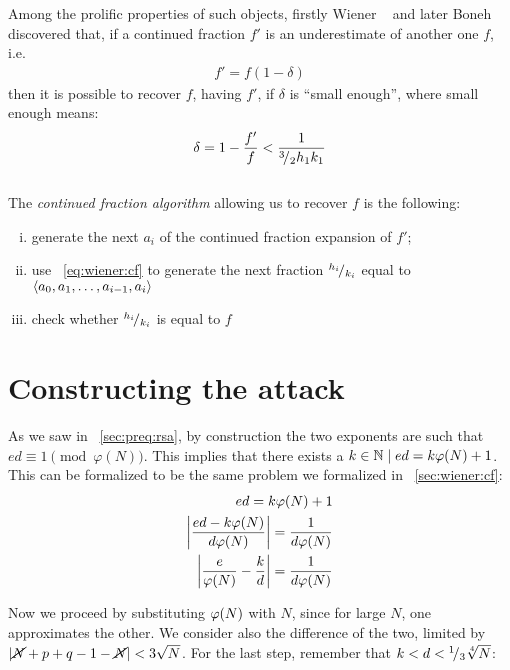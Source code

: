 Among the prolific properties of such objects, firstly Wiener ~\cite{wiener}
and later Boneh ~\cite{20years} discovered that, if a continued fraction $f'$ is
an underestimate of another one $f$, i.e.
\begin{align}
  f' = f(1-\delta)
\end{align}
then it is possible to recover $f$, having $f'$, if $\delta$ is ``small
enough'', where small enough means:
\begin{align}
  \label{eq:wiener:cf_approx}
  \delta = 1 - \frac{f'}{f} < \frac{1}{{}^{3}\!/_{2}{h_1}{k_1}}
\end{align}
\\
The \emph{continued fraction algorithm} allowing us to recover $f$ is the
following:
\begin{enumerate}[(i)]
  \setlength{\itemsep}{1pt}
  \setlength{\parskip}{0pt}
  \setlength{\parsep}{0pt}
  \item generate the next $a_i$ of the continued fraction expansion of $f'$;
  \item use ~\ref{eq:wiener:cf} to generate the next fraction ${}^{h_i}\!/_{k_i}$
    equal to $\langle a_0, a_1, \ldots, a_{i-1}, a_i\rangle$ %
  \item check whether ${}^{h_i}\!/_{k_i}$ is equal to $f$
\end{enumerate}

\section{Constructing the attack}

As we saw in ~\ref{sec:preq:rsa}, by construction the two exponents are such that
$ed \equiv 1 \pmod{\varphi(N)}$. This implies that there exists a
$k \in \mathbb{N} \mid ed = k\varphi(N) + 1$. This can be formalized to be
the same problem we formalized in ~\ref{sec:wiener:cf}:
\begin{align*}
  ed = k\varphi(N) + 1 \\
  \left|\frac{ed - k\varphi(N)}{d\varphi(N)}\right| = \frac{1}{d\varphi(N)} \\
  \left|\frac{e}{\varphi(N)} - \frac{k}{d}\right| = \frac{1}{d\varphi(N)} \\
\end{align*}

Now we proceed by substituting $\varphi(N)$ with $N$, since for large $N$, one
approximates the other. We consider also the difference of the two, limited by
$\left|\cancel{N} + p + q - 1 - \cancel{N}\right| < 3\sqrt{N}$.
For the last step, remember that $k < d < {}^{1}\!/_{3}\sqrt[4]{N}$:

